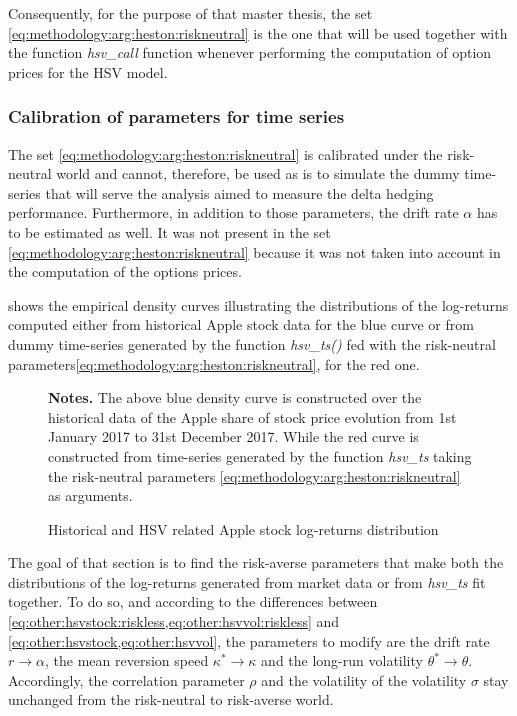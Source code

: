 \documentclass[12pt,a4paper]{report}
\begin{document}
Consequently, for the purpose of that master thesis, the set \ref{eq:methodology:arg:heston:riskneutral} is the one that will be used together with the function \textit{hsv\_call} function whenever performing the computation of option prices for the HSV model.

\subsubsection*{Calibration of parameters for time series}

The set \ref{eq:methodology:arg:heston:riskneutral} is calibrated under the risk-neutral world and cannot, therefore, be used as is to simulate the dummy time-series that will serve the analysis aimed to measure the delta hedging performance.
Furthermore, in addition to those parameters, the drift rate $\alpha$ has to be estimated as well. It was not present in the set  \ref{eq:methodology:arg:heston:riskneutral} because it was not taken into account in the computation of the options prices.

 shows the empirical density curves illustrating the distributions of the log-returns computed either from historical Apple stock data for the blue curve or from dummy time-series generated by the function \textit{hsv\_ts()} fed with the risk-neutral parameters\ref{eq:methodology:arg:heston:riskneutral}, for the red one.


\begin{figure}[h]
  \centering
  
  \caption{Historical and HSV related Apple stock log-returns distribution}
  \begin{changemargin}{0.5cm}{0.5cm}
  \medskip
\footnotesize
{}\textbf{Notes.} The above blue density curve is constructed over the historical data of the Apple share of stock price evolution from 1st January 2017 to 31st December 2017. While the red curve is constructed from time-series generated by the function \textit{hsv\_ts} taking the risk-neutral parameters \ref{eq:methodology:arg:heston:riskneutral} as arguments.  
\end{changemargin}
  \label{p:methodology:density:aapl:heston:riskneutral}
\end{figure}


The goal of that section is to find the risk-averse parameters that make both the distributions of the log-returns generated from market data or from \textit{hsv\_ts} fit together.
To do so, and according to the differences between \cref{eq:other:hsvstock:riskless,eq:other:hsvvol:riskless} and \cref{eq:other:hsvstock,eq:other:hsvvol}, the parameters to modify are the drift rate $r \to \alpha$, the mean reversion speed $\kappa^{*} \to \kappa$ and the long-run volatility $\theta^* \to \theta$.
Accordingly, the correlation parameter $\rho$ and the volatility of the volatility $\sigma$ stay unchanged from the risk-neutral to risk-averse world.
\end{document}
